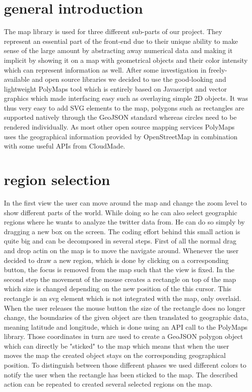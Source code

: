 \section{general introduction}

The map library is used for three different sub-parts of our project. They represent an essential part of the front-end due to their unique ability to make sense of the large amount by abstracting away numerical data and making it implicit by showing it on a map with geometrical objects and their color intensity which can represent information as well.
After some investigation in freely-available and open source libraries we decided to use the good-looking and lightweight PolyMaps tool which is entirely based on Javascript and vector graphics which made interfacing easy such as overlaying simple 2D objects. It was thus very easy to add SVG elements to the map, polygons such as rectangles are supported natively through the GeoJSON standard whereas circles need to be rendered individually. As most other open source mapping services PolyMaps uses the geographical information provided by OpenStreetMap in combination with some useful APIs from CloudMade. 

\section{region selection}
In the first view the user can move around the map and change the zoom level to show different parts of the world. While doing so he can also select geographic regions where he wants to analyze the twitter data from. He can do so simply by dragging a new box on the screen. The coding effort behind this small action is quite big and can be decomposed in several steps. First of all the normal drag and drop actin on the map is to move the navigate around. Whenever the user decided to draw a new region, which is done by clicking on a corresponding button, the focus is removed from the map such that the view is fixed. In the second step the movement of the mouse creates a rectangle on top of the map which size is changed depending on the new position of the this cursor. This rectangle is an svg element which is not integrated with the map, only overlaid. When the user releases the mouse button the size of the rectangle does no longer change, the boundaries of the given object are then translated to geographic data, meaning latitude and longitude, which is done using an API call to the PolyMaps library. Those coordinates in turn are used to create a GeoJSON polygon object which can directly be "sticked" to the map which means that when the user moves the map the created object stays on the corresponding geographical position. To distinguish between those different phases we used different colors to notify the user when the rectangle has been sticked to the map. The described action can be repeated to created several selected regions on the map.

